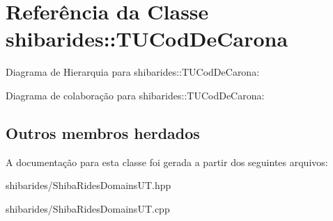 \hypertarget{classshibarides_1_1TUCodDeCarona}{}\section{Referência da Classe shibarides\+:\+:T\+U\+Cod\+De\+Carona}
\label{classshibarides_1_1TUCodDeCarona}


Diagrama de Hierarquia para shibarides\+:\+:T\+U\+Cod\+De\+Carona\+:


Diagrama de colaboração para shibarides\+:\+:T\+U\+Cod\+De\+Carona\+:
\subsection*{Outros membros herdados}


A documentação para esta classe foi gerada a partir dos seguintes arquivos\+:\begin{DoxyCompactItemize}
\item 
shibarides/Shiba\+Rides\+Domains\+U\+T.\+hpp\item 
shibarides/Shiba\+Rides\+Domains\+U\+T.\+cpp\end{DoxyCompactItemize}
